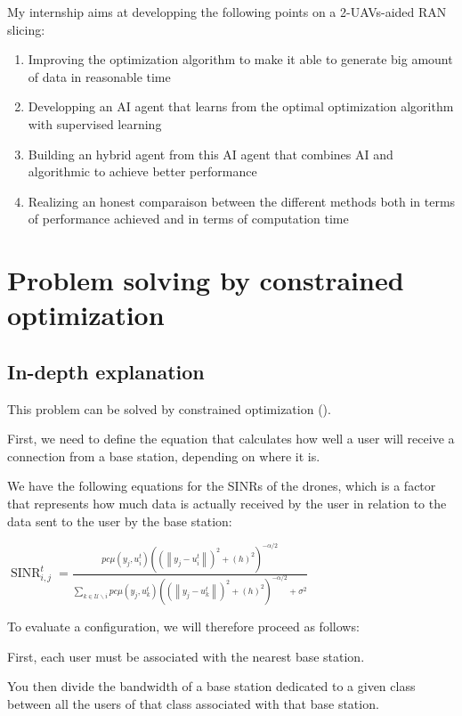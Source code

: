 \documentclass[letterpaper]{article}
\begin{document}
My internship aims at developping the following points on a 2-UAVs-aided RAN slicing:

\begin{enumerate}
    \item Improving the optimization algorithm to make it able to generate big amount of data in reasonable time
    \item Developping an AI agent that learns from the optimal optimization algorithm with supervised learning
    \item Building an hybrid agent from this AI agent that combines AI and algorithmic to achieve better performance
    \item Realizing an honest comparaison between the different methods both in terms of performance achieved and in terms of computation time
\end{enumerate}


\section{Problem solving by constrained optimization}

\subsection{In-depth explanation}

This problem can be solved by constrained optimization (\hspace{1sp}\cite{main_article}).

First, we need to define the equation that calculates how well a user will receive a connection from a base station, depending on where it is.

We have the following equations for the SINRs of the drones, which is a factor that represents how much data is actually received by the user in relation to the data sent to the user by the base station:

$\operatorname{SINR}_{i, j}^t=\frac{p c \mu\left(y_j, u_i^t\right)\left(\left(\left\|y_j-u_i^t\right\|\right)^2+\left(h\right)^2\right)^{-\alpha / 2}}{\sum\limits_{k \in \mathcal{U} \backslash i} p c \mu\left(y_j, u_k^t\right)\left(\left(\left\|y_j-u_k^t\right\|\right)^2+\left(h\right)^2\right)^{-\alpha / 2}+\sigma^2}$

To evaluate a configuration, we will therefore proceed as follows:

First, each user must be associated with the nearest base station.

You then divide the bandwidth of a base station dedicated to a given class between all the users of that class associated with that base station.
\end{document}
